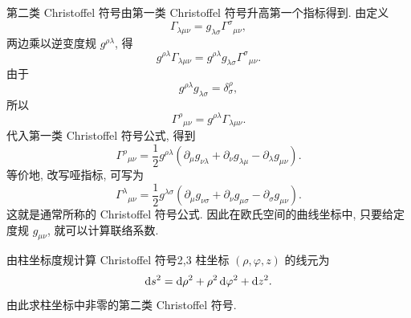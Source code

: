 第二类 Christoffel 符号由第一类 Christoffel 符号升高第一个指标得到. 由定义
\[
\Gamma_{\lambda\mu\nu}
=
g_{\lambda\sigma}\Gamma^{\sigma}{}_{\mu\nu},
\]
两边乘以逆变度规 $g^{\rho\lambda}$, 得
\[
g^{\rho\lambda}\Gamma_{\lambda\mu\nu}
=
g^{\rho\lambda}g_{\lambda\sigma}\Gamma^{\sigma}{}_{\mu\nu}.
\]
由于
\[
g^{\rho\lambda}g_{\lambda\sigma}
=
\delta^{\rho}_{\sigma},
\]
所以
\[
\Gamma^{\rho}{}_{\mu\nu}
=
g^{\rho\lambda}\Gamma_{\lambda\mu\nu}.
\]
代入第一类 Christoffel 符号公式, 得到
\begin{equation}
	\Gamma^{\rho}{}_{\mu\nu}
	=
	\frac{1}{2}g^{\rho\lambda}
	\left(
	\partial_{\mu}g_{\nu\lambda}
	+
	\partial_{\nu}g_{\lambda\mu}
	-
	\partial_{\lambda}g_{\mu\nu}
	\right).
	\label{eq:2.5}
\end{equation}
等价地, 改写哑指标, 可写为
\begin{equation}
	\Gamma^{\lambda}{}_{\mu\nu}
	=
	\frac{1}{2}g^{\lambda\sigma}
	\left(
	\partial_{\mu}g_{\nu\sigma}
	+
	\partial_{\nu}g_{\mu\sigma}
	-
	\partial_{\sigma}g_{\mu\nu}
	\right).
	\label{eq:2.6}
\end{equation}
这就是通常所称的 Christoffel 符号公式. 因此在欧氏空间的曲线坐标中, 只要给定度规 $g_{\mu\nu}$, 就可以计算联络系数. 

\begin{example}{由柱坐标度规计算 Christoffel 符号}{2,3}
	柱坐标 $(\rho,\varphi,z)$ 的线元为
	\[
	\mathop{}\!\mathrm{d} s^{2}
	=
	\mathop{}\!\mathrm{d}\rho^{2}
	+
	\rho^{2}\mathop{}\!\mathrm{d}\varphi^{2}
	+
	\mathop{}\!\mathrm{d} z^{2}.
	\]
	由此求柱坐标中非零的第二类 Christoffel 符号. 
\end{example}

